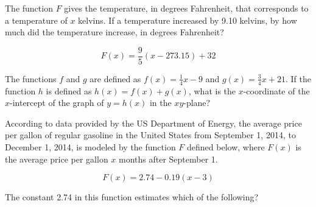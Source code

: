 \vspace{2em}
\noindent\markforreview

\vspace{1em}

The function \( F \) gives the temperature, in degrees Fahrenheit, that corresponds to a temperature of \( x \) kelvins. If a temperature increased by 9.10 kelvins, by how much did the temperature increase, in degrees Fahrenheit?

\[
F(x) = \frac{9}{5}(x - 273.15) + 32
\]

\vspace{0.75em}



\newpage
\noindent\markforreview

\vspace{1em}

The functions \( f \) and \( g \) are defined as \( f(x) = \frac{1}{4}x - 9 \) and \( g(x) = \frac{3}{4}x + 21 \). If the function \( h \) is defined as \( h(x) = f(x) + g(x) \), what is the \( x \)-coordinate of the \( x \)-intercept of the graph of \( y = h(x) \) in the \( xy \)-plane?



\vspace{2em}
\noindent\markforreview

\vspace{1em}

According to data provided by the US Department of Energy, the average price per gallon of regular gasoline in the United States from September 1, 2014, to December 1, 2014, is modeled by the function \( F \) defined below, where \( F(x) \) is the average price per gallon \( x \) months after September 1.

\[
F(x) = 2.74 - 0.19(x - 3)
\]

The constant 2.74 in this function estimates which of the following?

\vspace{0.75em}




\newpage
\noindent\markforreview

